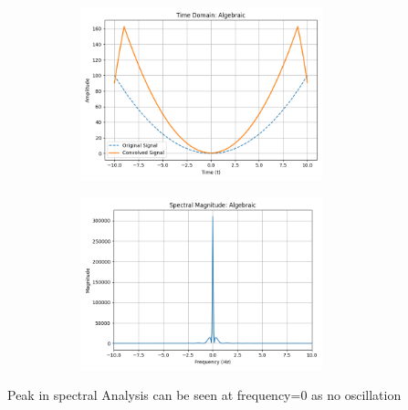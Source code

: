 \documentclass[a4paper,12pt]{article}
\begin{document}
\begin{figure}[H]
    \centering
    \begin{subfigure}{0.5\textwidth}
        \centering
        \includegraphics[height=5cm]{figs/Analysis2.png}
    \end{subfigure}%
    \begin{subfigure}{0.5\textwidth}
        \centering
        \includegraphics[height=5cm]{figs/Analysis3.png}
    \end{subfigure}
\end{figure}
Peak in spectral Analysis can be seen at frequency=0 as no oscillation
\end{document}

